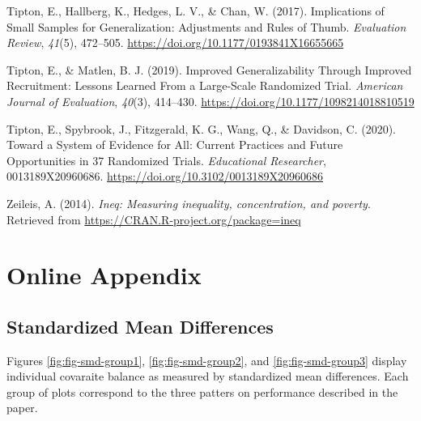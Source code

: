 \documentclass[english,man,floatsintext]{apa6}
\begin{document}
\leavevmode\hypertarget{ref-tiptonImplicationsSmallSamples2017}{}%
Tipton, E., Hallberg, K., Hedges, L. V., \& Chan, W. (2017). Implications of Small Samples for Generalization: Adjustments and Rules of Thumb. \emph{Evaluation Review}, \emph{41}(5), 472--505. \url{https://doi.org/10.1177/0193841X16655665}

\leavevmode\hypertarget{ref-tiptonImprovedGeneralizabilityImproved2019}{}%
Tipton, E., \& Matlen, B. J. (2019). Improved Generalizability Through Improved Recruitment: Lessons Learned From a Large-Scale Randomized Trial. \emph{American Journal of Evaluation}, \emph{40}(3), 414--430. \url{https://doi.org/10.1177/1098214018810519}

\leavevmode\hypertarget{ref-tiptonSystemEvidenceAll2020}{}%
Tipton, E., Spybrook, J., Fitzgerald, K. G., Wang, Q., \& Davidson, C. (2020). Toward a System of Evidence for All: Current Practices and Future Opportunities in 37 Randomized Trials. \emph{Educational Researcher}, 0013189X20960686. \url{https://doi.org/10.3102/0013189X20960686}

\leavevmode\hypertarget{ref-ineq}{}%
Zeileis, A. (2014). \emph{Ineq: Measuring inequality, concentration, and poverty}. Retrieved from \url{https://CRAN.R-project.org/package=ineq}

\endgroup

\newpage

\hypertarget{online-appendix}{%
\section{Online Appendix}\label{online-appendix}}

\hypertarget{standardized-mean-differences-1}{%
\subsection{Standardized Mean Differences}\label{standardized-mean-differences-1}}

Figures \ref{fig:fig-smd-group1}, \ref{fig:fig-smd-group2}, and \ref{fig:fig-smd-group3} display individual covaraite balance as measured by standardized mean differences. Each group of plots correspond to the three patters on performance described in the paper.
\end{document}
